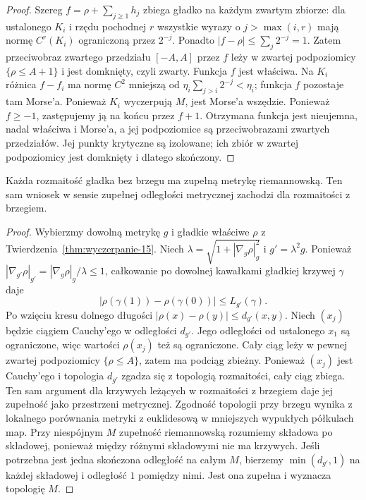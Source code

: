 \begin{proof}
Szereg $f=\rho+\sum_{j\geq1}h_j$
zbiega gładko na każdym zwartym
zbiorze: dla ustalonego $K_i$
i rzędu pochodnej $r$ wszystkie
wyrazy o $j>\max(i,r)$ mają normę
$C^r(K_i)$ ograniczoną przez
$2^{-j}$. Ponadto
$|f-\rho|\leq\sum_j2^{-j}=1$.
Zatem przeciwobraz zwartego
przedziału $[-A,A]$ przez $f$
leży w zwartej podpoziomicy
$\{\rho\leq A+1\}$ i jest
domknięty, czyli zwarty.
Funkcja $f$ jest właściwa.
Na $K_i$ różnica $f-f_i$
ma normę $C^2$ mniejszą
od $\eta_i\sum_{j>i}2^{-j}
<\eta_i$; funkcja $f$
pozostaje tam Morse'a.
Ponieważ $K_i$ wyczerpują
$M$, jest Morse'a wszędzie. Ponieważ $f\geq-1$,
zastępujemy ją na końcu przez $f+1$. Otrzymana funkcja
jest nieujemna, nadal właściwa i Morse'a, a jej
podpoziomice są przeciwobrazami zwartych przedziałów.
Jej punkty krytyczne są izolowane;
ich zbiór w zwartej podpoziomicy
jest domknięty i dlatego skończony.
\end{proof}

\begin{stwierdzenie}
\label{prop:metryka-zupelna-wyczerpanie}
Każda rozmaitość gładka bez brzegu
ma zupełną metrykę riemannowską.
Ten sam wniosek w sensie zupełnej
odległości metrycznej zachodzi
dla rozmaitości z brzegiem.
\end{stwierdzenie}
\begin{proof}
Wybierzmy dowolną metrykę $g$
i gładkie właściwe $\rho$
z Twierdzenia~\ref{thm:wyczerpanie-15}.
Niech
$\lambda=\sqrt{1+|\nabla_g\rho|_g^2}$
i $g'=\lambda^2g$.
Ponieważ
$|\nabla_{g'}\rho|_{g'}
=|\nabla_g\rho|_g/\lambda\leq1$,
całkowanie po dowolnej kawałkami
gładkiej krzywej $\gamma$ daje
\[
 |\rho(\gamma(1))-\rho(\gamma(0))|
 \leq L_{g'}(\gamma).
\]
Po wzięciu kresu dolnego długości
$|\rho(x)-\rho(y)|\leq d_{g'}(x,y)$.
Niech $(x_j)$ będzie ciągiem Cauchy'ego
w odległości $d_{g'}$. Jego odległości
od ustalonego $x_1$ są ograniczone,
więc wartości $\rho(x_j)$ też są
ograniczone. Cały ciąg leży
w pewnej zwartej podpoziomicy
$\{\rho\leq A\}$, zatem ma podciąg
zbieżny. Ponieważ $(x_j)$ jest
Cauchy'ego i topologia $d_{g'}$
zgadza się z topologią rozmaitości,
cały ciąg zbiega. Ten sam argument
dla krzywych leżących w rozmaitości
z brzegiem daje jej zupełność
jako przestrzeni metrycznej. Zgodność topologii
przy brzegu wynika z lokalnego porównania metryki
z euklidesową w mniejszych wypukłych półkulach map.
Przy niespójnym $M$ zupełność riemannowską rozumiemy
składowa po składowej, ponieważ między różnymi składowymi
nie ma krzywych. Jeśli potrzebna jest jedna skończona
odległość na całym $M$, bierzemy $\min(d_{g'},1)$
na każdej składowej i odległość $1$ pomiędzy nimi.
Jest ona zupełna i wyznacza topologię $M$.
\end{proof}

